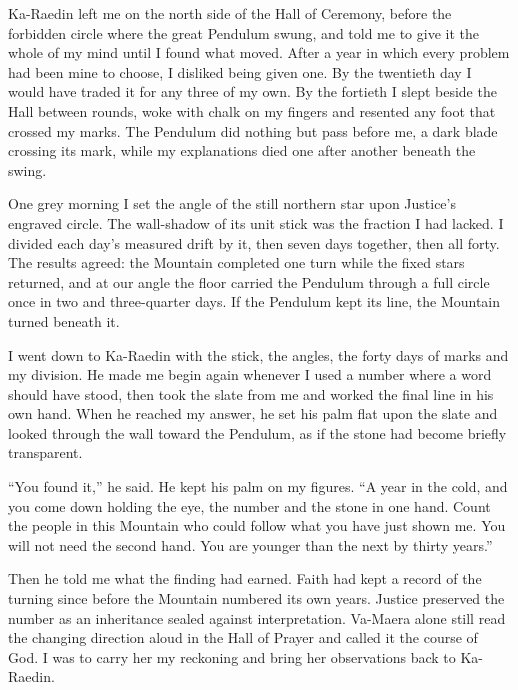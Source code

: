 Ka-Raedin left me on the north side of the Hall of Ceremony, before the forbidden circle where the great Pendulum swung, and told me to give it the whole of my mind until I found what moved. After a year in which every problem had been mine to choose, I disliked being given one. By the twentieth day I would have traded it for any three of my own. By the fortieth I slept beside the Hall between rounds, woke with chalk on my fingers and resented any foot that crossed my marks. The Pendulum did nothing but pass before me, a dark blade crossing its mark, while my explanations died one after another beneath the swing.\par

One grey morning I set the angle of the still northern star upon Justice's engraved circle. The wall-shadow of its unit stick was the fraction I had lacked. I divided each day's measured drift by it, then seven days together, then all forty. The results agreed: the Mountain completed one turn while the fixed stars returned, and at our angle the floor carried the Pendulum through a full circle once in two and three-quarter days. If the Pendulum kept its line, the Mountain turned beneath it.\par

I went down to Ka-Raedin with the stick, the angles, the forty days of marks and my division. He made me begin again whenever I used a number where a word should have stood, then took the slate from me and worked the final line in his own hand. When he reached my answer, he set his palm flat upon the slate and looked through the wall toward the Pendulum, as if the stone had become briefly transparent.\par

``You found it,'' he said. He kept his palm on my figures. ``A year in the cold, and you come down holding the eye, the number and the stone in one hand. Count the people in this Mountain who could follow what you have just shown me. You will not need the second hand. You are younger than the next by thirty years.''\par

Then he told me what the finding had earned. Faith had kept a record of the turning since before the Mountain numbered its own years. Justice preserved the number as an inheritance sealed against interpretation. Va-Maera alone still read the changing direction aloud in the Hall of Prayer and called it the course of God. I was to carry her my reckoning and bring her observations back to Ka-Raedin.\par

